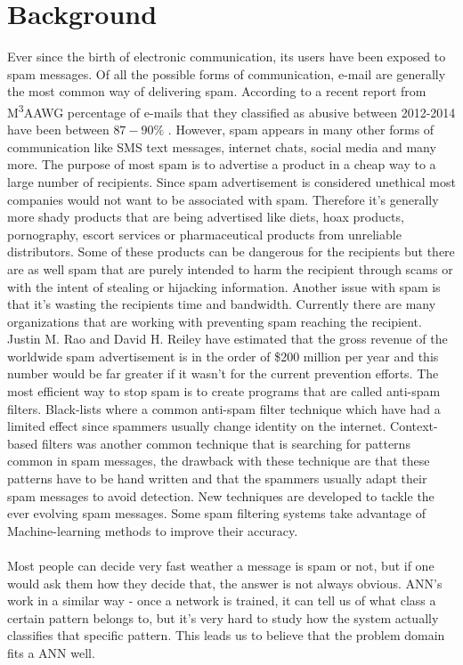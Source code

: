 
\section{Background}

Ever since the birth of electronic communication, its users have been exposed
to spam messages. Of all the possible forms of communication, e-mail are
generally the most common way of delivering spam. 
According to a recent report from M\textsuperscript{3}AAWG percentage of
e-mails that they classified as abusive between 2012-2014 have been between
$87-90\%$ \cite{M3AAWG2014}.  However, spam appears in many other forms of
communication like SMS text messages, internet chats, social media and many
more. The purpose of most spam is to advertise a product in a cheap way to a
large number of recipients. Since spam advertisement is considered unethical
most companies would not want to be associated with spam.  Therefore it's
generally more shady products that are being advertised like diets, hoax
products, pornography, escort services or pharmaceutical products from
unreliable distributors\cite{wikipedia}. Some of these products can be dangerous for the
recipients but there are as well spam that are purely intended to harm the
recipient through scams or with the intent of stealing or hijacking
information.  Another issue with spam is that it's wasting the recipients time
and bandwidth. Currently there are many organizations that are working with
preventing spam reaching the recipient.  Justin M. Rao and David H. Reiley
\cite{rao2012economics} have estimated that the gross revenue of the worldwide
spam advertisement is in the order of \$200 million per year and this number
would be far greater if it wasn't for the current prevention efforts.  The most
efficient way to stop spam is to create programs that are called anti-spam
filters. Black-lists where a common anti-spam filter technique which have had a
limited effect since spammers usually change identity on the internet.
Context-based filters was another common technique that is searching for
patterns common in spam messages, the drawback with these technique are that
these patterns have to be hand written and that the spammers usually adapt
their spam messages to avoid detection.  New techniques are developed to tackle
the ever evolving spam messages.\cite{spam-techniques} Some spam
filtering systems take advantage of Machine-learning methods to improve their
accuracy. \\\\ Most people can decide very fast weather a message is spam or
not, but if one would ask them how they decide that, the answer is not always
obvious.  ANN's work in a similar way - once a network is trained, it can tell
us of what class a certain pattern belongs to, but it's very hard to study how
the system actually classifies that specific pattern. This leads us to believe
that the problem domain fits a ANN well. 
